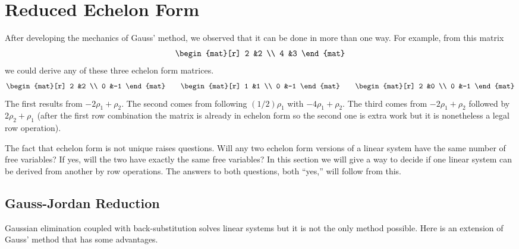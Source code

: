 \section{Reduced Echelon Form}
After developing the mechanics of Gauss' method, 
we observed that it can be done in more than one way.
For example, from this matrix 
\begin{equation*}
    \begin{mat}[r]
       2  &2  \\
       4  &3
    \end{mat}
\end{equation*}
we could derive any of these three echelon form matrices.
\begin{equation*}
    \begin{mat}[r]
       2  &2  \\
       0  &-1
    \end{mat}
    \qquad
    \begin{mat}[r]
       1  &1  \\
       0  &-1
    \end{mat}
    \qquad
    \begin{mat}[r]
       2  &0  \\
       0  &-1
    \end{mat}
\end{equation*}
The first results from $-2\rho_1+\rho_2$.
The second comes from following $(1/2)\rho_1$ with $-4\rho_1+\rho_2$.
The third comes
from $-2\rho_1+\rho_2$ followed by $2\rho_2+\rho_1$
(after the first row combination the matrix is already in
echelon form so the second one is extra work 
but it is nonetheless a legal row operation).

The fact that echelon form 
is not unique raises questions.
Will any two echelon form versions of a linear system have the same number of
free variables?
If yes, 
will the two have exactly the same free variables?
In this section we will 
give a way to decide if one linear system 
can be derived from another by row operations.
The answers to both questions, both ``yes,''
will follow from this.








\subsection{Gauss-Jordan Reduction}%
Gaussian elimination coupled with back-substitution
solves linear systems but it is not the only method possible.
Here is an extension of Gauss' method that has some advantages.

